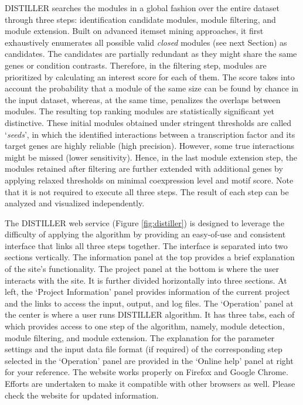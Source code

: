 DISTILLER searches the modules in a global fashion over the entire dataset through three steps: identification candidate modules, module filtering, and module extension. Built on advanced itemset mining approaches, it first exhaustively enumerates all possible valid \textit{closed} modules (see next Section) as candidates. The candidates are partially redundant as they might share the same genes or condition contrasts. Therefore, in the filtering step, modules are prioritized by calculating an interest score for each of them.  The score takes into account the probability that a module of the same size can be found by chance in the input dataset, whereas, at the same time, penalizes the overlaps between modules. The resulting top ranking modules are statistically significant yet distinctive. These initial modules obtained under stringent thresholds are called `\textit{seeds}', in which the identified interactions between a transcription factor and its target genes are highly reliable (high precision).  However, some true interactions might be missed (lower sensitivity). Hence, in the last module extension step, the modules retained after filtering are further extended with additional genes by applying relaxed thresholds on minimal coexpression level and motif score. Note that it is not required to execute all three steps.  The result of each step can be analyzed and visualized independently.

The DISTILLER web service \cite{DISTILLER} (Figure \ref{fig:distiller}) is  designed to leverage the difficulty of applying the algorithm by providing an  easy-of-use and consistent interface that links all three steps together.  The interface is separated into two sections vertically. The information panel at the top provides a brief explanation of the site's functionality. The project panel at the bottom is where the user interacts with the site. It is further divided horizontally into three sections.  At left, the `Project Information' panel provides information of the current project and the links to access the input, output, and log files. The `Operation' panel at the center is where a user runs DISTILLER algorithm. It has three tabs, each of which provides access to one step of the algorithm, namely, module detection, module filtering, and module extension. The explanation for the parameter settings and the input data file format (if required) of the corresponding step selected in the `Operation' panel are provided in the `Online help' panel at right for your reference.   The website works properly on Firefox and Google Chrome.  Efforts are undertaken to make it compatible with other browsers as well.  Please check the website for updated information. 

